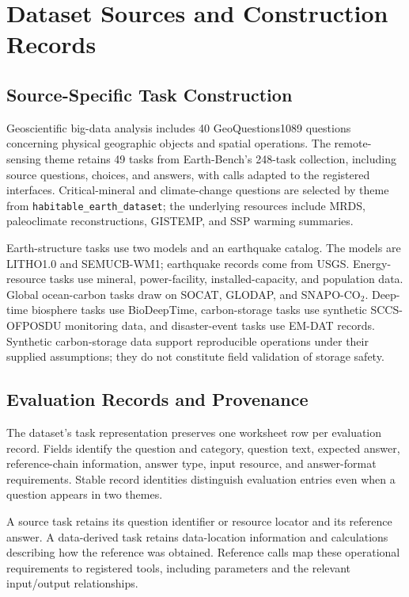 \section{Dataset Sources and Construction Records}
\label{app:dataset-details}

\subsection{Source-Specific Task Construction}
Geoscientific big-data analysis includes 40 GeoQuestions1089 questions concerning physical geographic objects and spatial operations. The remote-sensing theme retains 49 tasks from Earth-Bench's 248-task collection, including source questions, choices, and answers, with calls adapted to the registered interfaces. Critical-mineral and climate-change questions are selected by theme from \nolinkurl{habitable_earth_dataset}; the underlying resources include MRDS, paleoclimate reconstructions, GISTEMP, and SSP warming summaries.

Earth-structure tasks use two models and an earthquake catalog. The models are LITHO1.0 and SEMUCB-WM1; earthquake records come from USGS. Energy-resource tasks use mineral, power-facility, installed-capacity, and population data. Global ocean-carbon tasks draw on SOCAT, GLODAP, and SNAPO-CO$_2$. Deep-time biosphere tasks use BioDeepTime, carbon-storage tasks use synthetic SCCS-OFPOSDU monitoring data, and disaster-event tasks use EM-DAT records. Synthetic carbon-storage data support reproducible operations under their supplied assumptions; they do not constitute field validation of storage safety.

\subsection{Evaluation Records and Provenance}
The dataset's task representation preserves one worksheet row per evaluation record. Fields identify the question and category, question text, expected answer, reference-chain information, answer type, input resource, and answer-format requirements. Stable record identities distinguish evaluation entries even when a question appears in two themes.

A source task retains its question identifier or resource locator and its reference answer. A data-derived task retains data-location information and calculations describing how the reference was obtained. Reference calls map these operational requirements to registered tools, including parameters and the relevant input/output relationships.

